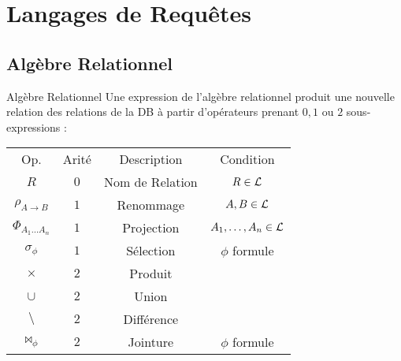 \documentclass{cours}
\begin{document}
\section{Langages de Requêtes}
\subsection{Algèbre Relationnel}
\begin{définition}{Algèbre Relationnel}{}
    Une expression de l'algèbre relationnel produit une nouvelle relation des relations de la DB à partir d'opérateurs prenant $0, 1$ ou $2$ sous-expressions : 
    \begin{center}
        \begin{tabular}{cccc}
            \toprule
            Op. & Arité & Description & Condition\\
            $R$ & $0$ & Nom de Relation & $R\in \mathcal{L}$\\
            $\rho_{A \to B}$ & $1$ & Renommage & $A, B \in \mathcal{L}$\\
            $\Phi_{A_{1}\ldots A_{n}}$ & $1$ & Projection & $A_{1},\ldots, A_{n} \in \mathcal{L}$\\
            $\sigma_{\phi}$ & $1$ & Sélection & $\phi$ formule\\
            $\times$ & $2$ & Produit & \\
            $\cup$ & $2$ & Union & \\
            $\setminus$ & $2$ & Différence & \\
            $\bowtie_{\phi}$ & $2$ & Jointure & $\phi$ formule
        \end{tabular}
    \end{center}
\end{définition}
\end{document}
